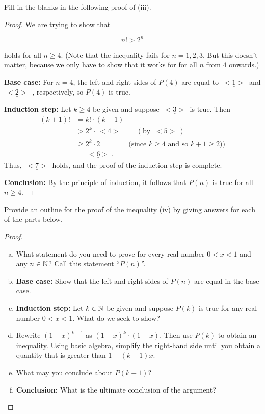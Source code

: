 \begin{exercise}{}
Fill in the blanks in the following proof of (iii).

\begin{proof}

We are trying to show that 
\smallskip

\[
n!>2^n
\tag{$P(n)$}
\]
\smallskip

holds for all $n\ge4$.
(Note that  the  inequality fails for $n=1,2,3$. But this doesn't matter, because we only have to show that it works for for all $n$ from $4$ onwards.) 


\noindent
\textbf{Base case:} For $n=4$, the left and right sides of $P(4)$ are equal to
$\underline{~<1>~}$   and $\underline{~<2>~}$ , respectively, so $P(4)$ is true. 

\noindent
\textbf{Induction step:} Let $k\ge4$ be given and suppose 
$\underline{~<3>~}$  is true. Then
\begin{align*}
(k+1)!&=k! \cdot (k+1)
\\
&>2^k \cdot \underline{~<4>~}
\qquad (\text{by } \underline{~<5>~} )
\\
&\ge 2^k\cdot 2
\qquad \qquad \text{(since $k\ge4$ and so $k+1\ge2$))}
\\
&=\underline{~<6>~}.
\end{align*}
Thus, $\underline{~<7>~}$  holds, and the proof of the induction step is complete. 

\noindent
\textbf{Conclusion:} By the principle of induction, 
it follows that  $P(n)$ is true for all $n\ge4$.  
\end{proof}

\end{exercise}

\begin{exercise}{}
Provide an outline for the proof of the inequality (iv) by giving answers for each of the parts below.

\begin{proof}
\begin{enumerate}[(a)]
\item
What statement do you need to prove for every  real number $0<x<1$  
and any $n\in\mathbb{N}$?  Call this statement ``$P(n)$''.
\item  \textbf{Base case:} Show that  the left and right sides of $P(n)$ are 
 equal in the base case.
\item
\textbf{Induction step:} Let $k\in\mathbb{N}$ be given and suppose $P(k)$ is true
for any real number $0<x<1$.   What do we seek to show?
\item
Rewrite $(1-x)^{k+1}$ as $(1-x)^k \cdot (1-x)$. Then use $P(k)$ to obtain an inequality. Using basic algebra, simplify the right-hand side until you obtain a quantity that is greater than $1-(k+1)x$.
\item
What may you conclude about $P(k+1)$?
\item
\textbf{Conclusion:} What is the ultimate conclusion of the argument?
\end{enumerate}
\end{proof}
\end{exercise}

